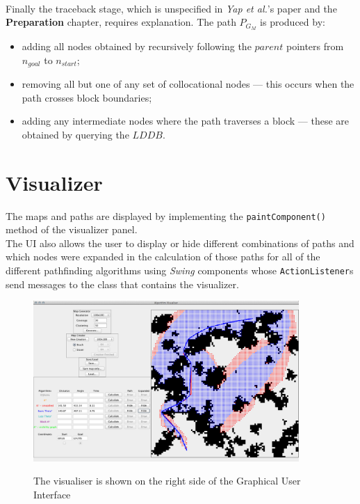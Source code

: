 \documentclass[12pt,notitlepage]{report}
\begin{document}
\\
\noindent
Finally the traceback stage, which is unspecified in {\em Yap et al.}'s paper and the {\bfseries Preparation} chapter, requires explanation. The path $P_{G_{M}}$ is produced by:
\begin{itemize}
\item adding all nodes obtained by recursively following the $parent$ pointers from $n_{goal}$ to $n_{start}$;
\item removing all but one of any set of collocational nodes --- this occurs when the path crosses block boundaries;
\item adding any intermediate nodes where the path traverses a block --- these are obtained by querying the $LDDB$.
\end{itemize}
 
\section{Visualizer}

The maps and paths are displayed by implementing the {\tt paintComponent()} method of the visualizer panel.\\

\noindent The UI also allows the user to display or hide different combinations of paths and which nodes were expanded in the calculation of those paths for all of the different pathfinding algorithms using {\em Swing} components whose {\tt ActionListener}s send messages to the class that contains the visualizer.

\begin{figure}
\centering
  {\includegraphics[width=0.9\textwidth]{gui.png}}
  \caption[Graphical user interface]{The visualiser is shown on the right side of the Graphical User Interface} 
\end{figure}
\end{document}
